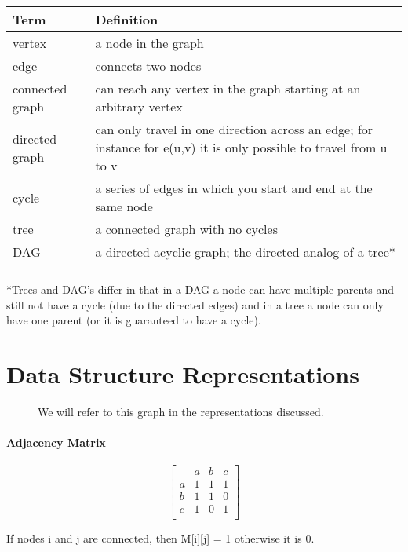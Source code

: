\begin{tabular}{lp{12cm}}
    \toprule
    Term & Definition \\
    \midrule
    vertex    & a node in the graph \\
    \addlinespace
    edge    & connects two nodes \\
    \addlinespace
    connected graph    & can reach any vertex in the graph starting at an arbitrary vertex \\
    \addlinespace
    directed graph    & can only travel in one direction across an edge; for instance for e(u,v) it is only possible to travel from u to v \\
    \addlinespace
    cycle & a series of edges in which you start and end at the same node \\
    \addlinespace
    tree & a connected graph with no cycles \\
    \addlinespace
    DAG & a directed acyclic graph; the directed analog of a tree*  \\
    \addlinespace
    \bottomrule
  \end{tabular}

  *Trees and DAG's differ in that in a DAG a node can have multiple parents and still not have a cycle (due to the directed edges) and in a tree a node can only have one parent (or it is guaranteed to have a cycle).

\section{Data Structure Representations}

\begin{figure}[t]
    \centering
    \caption{We will refer to this graph in the representations discussed.}
\end{figure}

\paragraph{Adjacency Matrix}
\[
\begin{bmatrix}
     & a & b & c \\
   a & 1 & 1 & 1 \\
   b & 1 & 1 & 0 \\
   c & 1 & 0 & 1 \\
\end{bmatrix}
\]

If nodes i and j are connected, then M[i][j] = 1 otherwise it is 0.

